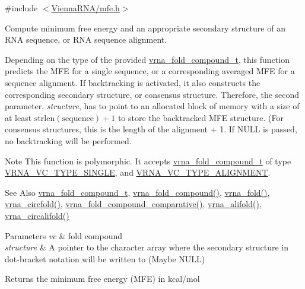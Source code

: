 {\ttfamily \#include $<$\hyperlink{mfe_8h}{Vienna\-R\-N\-A/mfe.\-h}$>$}



Compute minimum free energy and an appropriate secondary structure of an R\-N\-A sequence, or R\-N\-A sequence alignment. 

Depending on the type of the provided \hyperlink{group__fold__compound_ga1b0cef17fd40466cef5968eaeeff6166}{vrna\-\_\-fold\-\_\-compound\-\_\-t}, this function predicts the M\-F\-E for a single sequence, or a corresponding averaged M\-F\-E for a sequence alignment. If backtracking is activated, it also constructs the corresponding secondary structure, or consensus structure. Therefore, the second parameter, {\itshape structure}, has to point to an allocated block of memory with a size of at least $\mathrm{strlen}(\mathrm{sequence})+1$ to store the backtracked M\-F\-E structure. (For consensus structures, this is the length of the alignment + 1. If {\ttfamily N\-U\-L\-L} is passed, no backtracking will be performed.

\begin{DoxyNote}{Note}
This function is polymorphic. It accepts \hyperlink{group__fold__compound_ga1b0cef17fd40466cef5968eaeeff6166}{vrna\-\_\-fold\-\_\-compound\-\_\-t} of type \hyperlink{group__fold__compound_gga01a4ff86fa71deaaa5d1abbd95a1447da1608d3aa78905fc39e0d25a624ac9512}{V\-R\-N\-A\-\_\-\-V\-C\-\_\-\-T\-Y\-P\-E\-\_\-\-S\-I\-N\-G\-L\-E}, and \hyperlink{group__fold__compound_gga01a4ff86fa71deaaa5d1abbd95a1447da056345f1bcfe7cd595d1fd437c05246d}{V\-R\-N\-A\-\_\-\-V\-C\-\_\-\-T\-Y\-P\-E\-\_\-\-A\-L\-I\-G\-N\-M\-E\-N\-T}.
\end{DoxyNote}
\begin{DoxySeeAlso}{See Also}
\hyperlink{group__fold__compound_ga1b0cef17fd40466cef5968eaeeff6166}{vrna\-\_\-fold\-\_\-compound\-\_\-t}, \hyperlink{group__fold__compound_ga6601d994ba32b11511b36f68b08403be}{vrna\-\_\-fold\-\_\-compound()}, \hyperlink{group__mfe__fold__single_gae7ca49ffb3086f145da36c964a7cec64}{vrna\-\_\-fold()}, \hyperlink{group__mfe__fold__single_gaa0f5bf321038f404b36a6147bdae4154}{vrna\-\_\-circfold()}, \hyperlink{group__fold__compound_gad6bacc816af274922b13d947f708aa0c}{vrna\-\_\-fold\-\_\-compound\-\_\-comparative()}, \hyperlink{group__consensus__mfe__fold_ga02098d0c8790f9a37fbef6ad0cfc705c}{vrna\-\_\-alifold()}, \hyperlink{group__consensus__mfe__fold_ga01ce2cff93ea44c4f4254760ca2bd16c}{vrna\-\_\-circalifold()}
\end{DoxySeeAlso}

\begin{DoxyParams}{Parameters}
{\em vc} & fold compound \\
\hline
{\em structure} & A pointer to the character array where the secondary structure in dot-\/bracket notation will be written to (Maybe N\-U\-L\-L)\\
\hline
\end{DoxyParams}
\begin{DoxyReturn}{Returns}
the minimum free energy (M\-F\-E) in kcal/mol 
\end{DoxyReturn}
